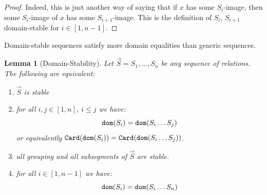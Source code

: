 \documentclass{lmcs}
\newtheorem{lemma}[theorem]{Lemma}
\begin{document}
\begin{proof}
Indeed, this is just another way of saying that if $x$ has some $S_i$-image,
then some $S_i$-image of $x$ has some $S_{i+1}$-image. This is the definition
of $S_i$, $S_{i+1}$ domain-stable for $i \in [1,n-1]$. 
\end{proof}

Domain-stable sequences satisfy more domain equalities than generic sequences.


\begin{lemma}[Domain-Stability]
\label{lemma-domain-stability}
Let $\vec{S}=S_1, \ldots, S_n$ be any sequence of relations. The following are equivalent:

\begin{enumerate}
\item
\label{lemma-domain-stability-01}
$\vec{S}$ is stable

\item
\label{lemma-domain-stability-02}
for all $i, j \in [1, n]$, $i \le j$ we have:
$$
{\tt dom}(S_i) =  {\tt dom}(S_i \ldots S_j)
$$
or equivalently ${\tt Card}({\tt dom}(S_i)) =  {\tt Card}({\tt dom}(S_i \ldots S_j))$.

\item
\label{lemma-domain-stability-03}
all grouping and all subsegments of $\vec{S}$ are stable.

\item 
\label{lemma-domain-stability-04}
for all $i \in [1,n-1]$ we have:
$$
{\tt dom}(S_i) = {\tt dom}(S_i \ldots S_n)
$$

\end{enumerate}



\end{lemma}
\end{document}

